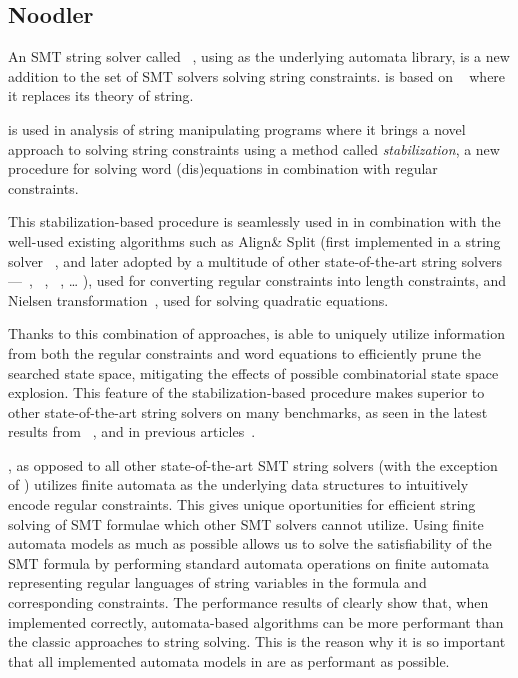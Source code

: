 \subsection{Noodler}

An SMT string solver called \noodler~\cite{fm23_equations_synergy_regular_constraints_DBLP:conf/fm/BlahoudekCCHHLS23, oopsla23_stabilization_DBLP:journals/pacmpl/ChenCHHLS23,tacas24_noodler_10.1007/978-3-031-57246-3_2}, using \mata as the underlying automata library, is a new addition to the set of SMT solvers solving string constraints.
\noodler is based on \ziii~\cite{z3} where it replaces its theory of string.

\noodler is used in analysis of string manipulating programs where it brings a novel approach to solving string constraints using a method called \emph{stabilization}, a new procedure for solving word (dis)equations in combination with regular constraints.

This stabilization-based procedure is seamlessly used in \noodler in combination with the well-used existing algorithms such as
Align\& Split (first implemented in a string solver \norn~\cite{Norn,AutomataSplitting}, and later adopted by a multitude of other state-of-the-art string solvers---\ostrich~\cite{AnthonyTowards2016,AnthonyReplaceAll2018,AnthonyComplex2019,AnthonyRegex2022,AnthonyInteger2020},
\ziiistriiire~\cite{Z3str3RE,BerzishDGKMMN23}, \sloth~\cite{holik_string_2018}, \ldots
), used for converting regular constraints into length constraints, and
Nielsen transformation~\cite{nielsen1917}, used for solving quadratic equations.

Thanks to this combination of approaches, \noodler is able to uniquely utilize information from both the regular constraints and word equations to efficiently prune the searched state space, mitigating the effects of possible combinatorial state space explosion.
This feature of the stabilization-based procedure makes \noodler superior to other state-of-the-art string solvers on many benchmarks, as seen in the latest results from \noodler~\cite{tacas24_noodler_10.1007/978-3-031-57246-3_2}, and in previous articles~\cite{fm23_equations_synergy_regular_constraints_DBLP:conf/fm/BlahoudekCCHHLS23, oopsla23_stabilization_DBLP:journals/pacmpl/ChenCHHLS23}.

\noodler, as opposed to all other state-of-the-art SMT string solvers (with the exception of \ostrich) utilizes finite automata as the underlying data structures to intuitively encode regular constraints.
This gives \noodler unique oportunities for efficient string solving of SMT formulae which other SMT solvers cannot utilize.
Using finite automata models as much as possible allows us to solve the satisfiability of the SMT formula by performing standard automata operations on finite automata representing regular languages of string variables in the formula and corresponding constraints.
The performance results of \noodler clearly show that, when implemented correctly, automata-based algorithms can be more performant than the classic approaches to string solving.
This is the reason why it is so important that all implemented automata models in \mata are as performant as possible.

